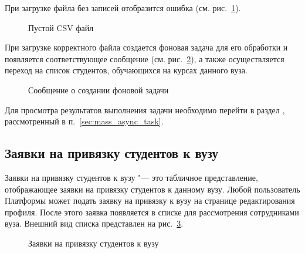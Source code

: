 При загрузке файла без записей отобразится ошибка (см. рис.~\ref{img:student:mass_change_mode_empty_csv}).
\begin{figure}[H]
	\caption{Пустой CSV файл}
	\label{img:student:mass_change_mode_empty_csv}
\end{figure}

При загрузке корректного файла создается фоновая задача для его обработки и появляется соответствующее сообщение 
(см. рис.~\ref{img:student:mass_change_mode_task}), а также осуществляется переход на список студентов, 
обучающихся на курсах данного вуза.

\begin{figure}[H]
	\caption{Сообщение о создании фоновой задачи}
	\label{img:student:mass_change_mode_task}
\end{figure}
Для просмотра результатов выполнения задачи необходимо перейти в раздел , 
рассмотренный в п.~\ref{sec:mass_async_task}.

\subsection{Заявки на привязку студентов к вузу}
Заявки на привязку студентов к вузу "--- это табличное представление, отображающее заявки 
на привязку студентов к данному вузу. Любой пользователь Платформы может подать заявку на привязку к вузу на 
странице редактирования профиля. После этого заявка появляется в списке для рассмотрения сотрудниками вуза.
Внешний вид списка представлен на рис.~\ref{img:student:bind_request_list}. 
\begin{figure}[H]
	\caption{Заявки на привязку студентов к вузу}
	\label{img:student:bind_request_list}
\end{figure}

